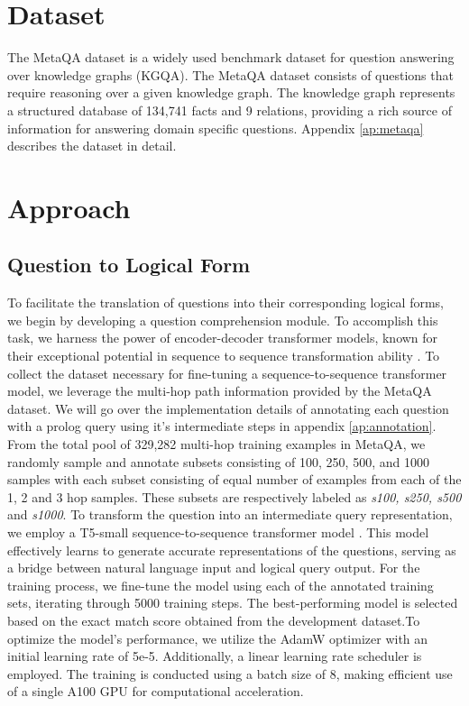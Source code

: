 \documentclass[11pt]{article}
\begin{document}
\section{Dataset}

The MetaQA dataset is a widely used benchmark dataset for question answering over knowledge graphs (KGQA). The MetaQA dataset consists of questions that require reasoning over a given knowledge graph. The knowledge graph represents a structured database of 134,741 facts and 9 relations, providing a rich source of information for answering domain specific questions. Appendix \ref{ap:metaqa} describes the dataset in detail.

\section{Approach}
\label{sec:approach}


\subsection{Question to Logical Form}
\label{sec:q2l}

To facilitate the translation of questions into their corresponding logical forms, we begin by developing a question comprehension module. To accomplish this task, we harness the power of encoder-decoder transformer models, known for their exceptional potential in sequence to sequence transformation ability \citep{Vaswani2017AttentionIA}. To collect the dataset necessary for fine-tuning a sequence-to-sequence transformer model, we leverage the multi-hop path information provided by the MetaQA dataset. We will go over the implementation details of annotating each question with a prolog query using it's intermediate steps in appendix \ref{ap:annotation}. From the total pool of 329,282 multi-hop training examples in MetaQA, we randomly sample and annotate subsets consisting of 100, 250, 500, and 1000 samples with each subset consisting of equal number of examples from each of the 1, 2 and 3 hop samples. These subsets are respectively labeled as \emph{s100, s250, s500} and \emph{s1000}. 
To transform the question into an intermediate query representation, we employ a T5-small sequence-to-sequence transformer model \citep{Raffel2019ExploringTL}. This model effectively learns to generate accurate representations of the questions, serving as a bridge between natural language input and logical query output. For the training process, we fine-tune the model using each of the annotated training sets, iterating through 5000 training steps. The best-performing model is selected based on the exact match score obtained from the development dataset.To optimize the model's performance, we utilize the AdamW optimizer with an initial learning rate of 5e-5. Additionally, a linear learning rate scheduler is employed. The training is conducted using a batch size of 8, making efficient use of a single A100 GPU for computational acceleration.
\end{document}
